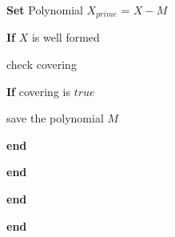 \begin{centering}
\begin{block}
\hspace{10mm}\textbf{Set} Polynomial $X_{prime}$ = $X-M$
\vspace{2mm}

\hspace{10mm}\textbf{If} $X$ is well formed
\vspace{1mm}

\hspace{15mm}check covering

\vspace{1mm}

\hspace{15mm}\textbf{If} covering is $true$

\hspace{20mm}save the polynomial $M$ 

\hspace{15mm}\textbf{end}
\vspace{2mm}

\hspace{10mm}\textbf{end}
\vspace{2mm}

\hspace{5mm}\textbf{end}
\vspace{2mm}

\textbf{end}

\end{block}

\end{centering}


